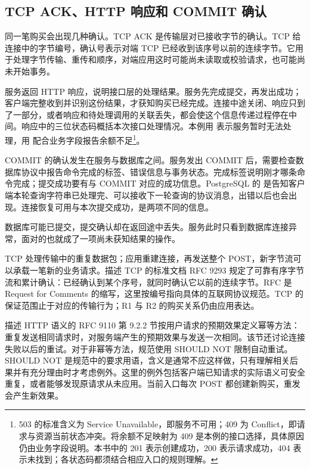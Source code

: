 \subsection*{TCP ACK、HTTP 响应和 COMMIT 确认}

同一笔购买会出现几种确认。TCP ACK 是传输层对已接收字节的确认。TCP 给连接中的字节编号，确认号表示对端 TCP 已经收到该序号以前的连续字节。它用于处理字节传输、重传和顺序，对端应用这时可能尚未读取或校验请求，也可能尚未开始事务。

服务返回 HTTP 响应，说明接口层的处理结果。服务先完成提交，再发出成功；客户端完整收到并识别这份结果，才获知购买已经完成。连接中途关闭、响应只到了一部分，或者响应和待处理调用的关联丢失，都会使这个信息传递过程停在中间。响应中的三位状态码概括本次接口处理情况。本例用  表示服务暂时无法处理，用  配合业务字段报告余额不足\footnote{503 的标准含义为 Service Unavailable，即服务不可用；409 为 Conflict，即请求与资源当前状态冲突。将余额不足映射为 409 是本例的接口选择，具体原因仍由业务字段说明。本书中的 201 表示创建成功，200 表示请求成功，404 表示未找到；各状态码都须结合相应入口的规则理解。}。

COMMIT 的确认发生在服务与数据库之间。服务发出 COMMIT 后，需要检查数据库协议中报告命令完成的标签、错误信息与事务状态。完成标签说明刚才哪条命令完成；提交成功要有与 COMMIT 对应的成功信息。PostgreSQL 的  是告知客户端本轮查询字符串已处理完、可以接收下一轮查询的协议消息，出错以后也会出现。连接恢复可用与本次提交成功，是两项不同的信息。

数据库可能已提交，提交确认却在返回途中丢失。服务此时只看到数据库连接异常，面对的也就成了一项尚未获知结果的操作。



TCP 处理传输中的重复数据包；应用重建连接，再发送整个 POST，新字节流可以承载一笔新的业务请求。描述 TCP 的标准文档 RFC 9293 规定了可靠有序字节流和累计确认：已经确认到某个序号，就同时确认它以前的连续字节\cite{tcp}。RFC 是 Request for Comments 的缩写，这里按编号指向具体的互联网协议规范。TCP 的保证范围止于对应的传输行为；R1 与 R2 的购买关系仍由应用表达。

描述 HTTP 语义的 RFC 9110 第 9.2.2 节按用户请求的预期效果定义幂等方法：重复发送相同请求时，对服务端产生的预期效果与发送一次相同。该节还讨论连接失败以后的重试。对于非幂等方法，规范使用 SHOULD NOT 限制自动重试。SHOULD NOT 是规范中的要求用语，含义是通常不应这样做，只有理解相关后果并有充分理由时才考虑例外。这里的例外包括客户端已知请求的实际语义可安全重复，或者能够发现原请求从未应用\cite{http}。当前入口每次 POST 都创建新购买，重发会产生新效果。

